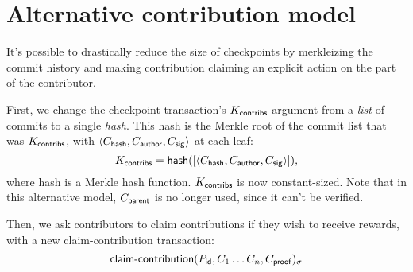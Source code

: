 \newpage
\appendix


\section{Alternative contribution model}
It's possible to drastically reduce the size of checkpoints by merkleizing the commit
history and making contribution claiming an explicit action on the part of
the contributor.

First, we change the checkpoint transaction's $K_{\mathsf{contribs}}$ argument from a \emph{list}
of commits to a single \emph{hash}. This hash is the Merkle root of the commit list
that was $K_{\mathsf{contribs}}$, with $\langle C_{\mathsf{hash}}, C_{\mathsf{author}}, C_{\mathsf{sig}}\rangle$ at each leaf:
\[
    K_{\mathsf{contribs}} = \operatorname{\mathsf{hash}}(
        [\langle C_{\mathsf{hash}}, C_{\mathsf{author}}, C_{\mathsf{sig}}\rangle]
    ),
\]
where \textsf{hash} is a Merkle hash function. $K_{\mathsf{contribs}}$ is
now constant-sized. Note that in this alternative model, $C_{\mathsf{parent}}$ is
no longer used, since it can't be verified.

Then, we ask contributors to claim contributions if they wish to receive rewards, with
a new \textsf{claim-contribution} transaction:
\[
    \operatorname{\mathsf{claim-contribution}}\lparen P_{\mathsf{id}}, C_1 \dots C_n, C_{\mathsf{proof}}\rparen_\sigma
\]

